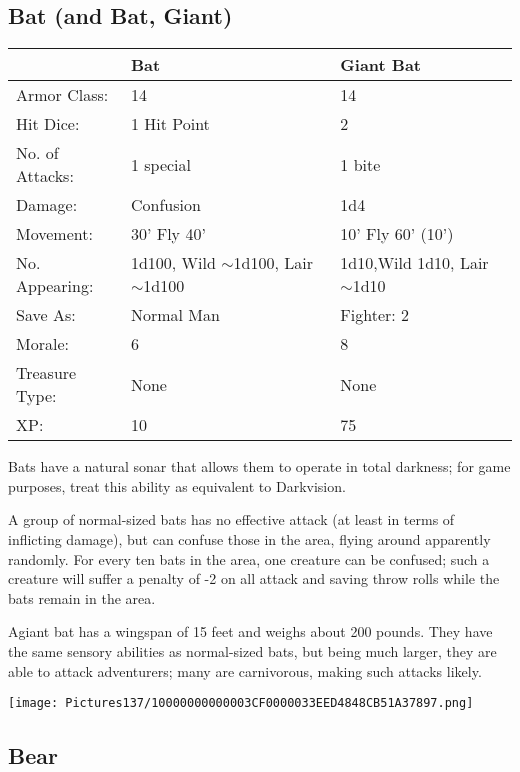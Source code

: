 \documentclass[a4paper,twoside,openany,10pt]{book}
\begin{document}
\begin{multicols}{2}
\subsection*{Bat (and Bat, Giant)}\label{bat-and-bat-giant}


\begin{flushleft}
	\begin{tabularx}{0.48\textwidth}{lXX}
& Bat & Giant Bat \\\hline
Armor Class: & 14 & 14 \\\hline
Hit Dice: & 1 Hit Point & 2 \\\hline
No. of Attacks: & 1 special & 1 bite \\\hline
Damage: & Confusion & 1d4 \\\hline
Movement: & 30' Fly 40' &10' Fly 60' (10') \\\hline
No. Appearing: & 1d100, Wild $\sim$1d100, Lair $\sim$1d100 & 1d10,Wild 1d10, Lair $\sim$1d10 \\\hline
Save As: & Normal Man & Fighter: 2 \\\hline
Morale: & 6 & 8 \\\hline
Treasure Type: & None & None \\\hline
XP: & 10 & 75 \\\hline
\end{tabularx}\medskip
\end{flushleft}

Bats have a natural sonar that allows them to operate in total darkness; for game purposes, treat this ability as equivalent to Darkvision.

A group of normal-sized bats has no effective attack (at least in terms of inflicting damage), but can confuse those in the area, flying around apparently randomly. For every ten bats in the area, one creature can be confused; such a creature will suffer a penalty of -2 on all attack and saving throw rolls while the bats remain in the area.

Agiant bat has a wingspan of 15 feet and weighs about 200 pounds. They have the same sensory abilities as normal-sized bats, but being much larger, they are able to attack adventurers; many are carnivorous, making such attacks likely.

\begin{center}
	\texttt{[image: Pictures137/10000000000003CF0000033EED4848CB51A37897.png]}
\end{center}


\subsection*{Bear}\label{bear}


\end{multicols}
\end{document}
